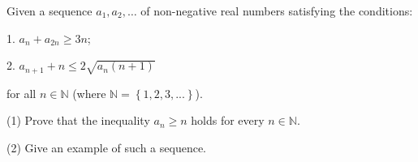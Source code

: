 Given a sequence $a_1,a_2,\ldots $ of non-negative real numbers satisfying the conditions:

1. $a_n + a_{2n} \geq 3n$;

2. $a_{n+1}+n \leq 2\sqrt{a_n \left(n+1\right)}$

for all $n\in\mathbb N$ (where $\mathbb N=\left\{1,2,3,...\right\}$).

(1) Prove that the inequality $a_n \geq n$ holds for every $n \in \mathbb N$.

(2) Give an example of such a sequence.